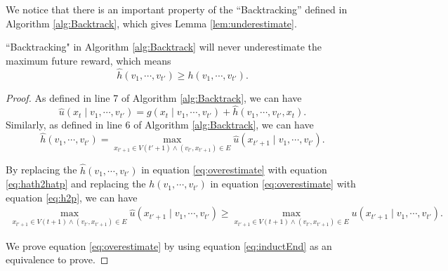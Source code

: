 We notice that there is an important property of the ``Backtracking'' defined in Algorithm \ref{alg:Backtrack}, which gives Lemma \ref{lem:underestimate}.

\begin{lem}
\label{lem:underestimate}
``Backtracking" in Algorithm \ref{alg:Backtrack} will never underestimate the maximum future reward, which means 
\begin{equation}
\label{eq:overestimate}
\hat{h}( v_{1} , \cdots , v_{t'} ) \geq h( v_{1} , \cdots , v_{t'} ).
\end{equation}
\begin{proof}


As defined in line 7 of Algorithm \ref{alg:Backtrack}, we can have
\begin{equation}
\label{eq:hatp_def}
\hat{u}( x_{t} \mid v_{1} , \cdots , v_{t'} ) = g(x_{t} \mid v_{1} , \cdots , v_{t'} ) + \hat{h}(v_{1} , \cdots , v_{t'}, x_{t} ).
\end{equation}
Similarly, as defined in line 6 of Algorithm \ref{alg:Backtrack}, we can have
\begin{equation}
\label{eq:hath2hatp}
\hat{h}( v_{1} , \cdots , v_{t'} ) = \max_{x_{t'+1} \in V(t'+1) \land (v_{t'}, x_{t'+1}) \in E} \hat{u}(x_{t'+1} \mid v_{1} , \cdots , v_{t'} ).
\end{equation}

By replacing the $ \hat{h}( v_{1} , \cdots , v_{t'} ) $ in equation \eqref{eq:overestimate} with equation \eqref{eq:hath2hatp} and replacing the $ h( v_{1} , \cdots , v_{t'} ) $ in equation \eqref{eq:overestimate} with equation \eqref{eq:h2p}, we can have
\begin{equation}
\label{eq:inductEnd}
\begin{aligned}
\max_{x_{t'+1} \in V(t+1) \land (v_{t'}, x_{t'+1}) \in E } \hat{u}(x_{t'+1} \mid v_{1} , \cdots , v_{t'} ) \geq \max_{x_{t'+1} \in V(t+1) \land (v_{t'}, x_{t'+1}) \in E } u(x_{t'+1} \mid v_{1} , \cdots , v_{t'} ).
\end{aligned}
\end{equation}

We prove equation \eqref{eq:overestimate} by using equation \eqref{eq:inductEnd} as an equivalence to prove.


\end{proof}
\end{lem}
